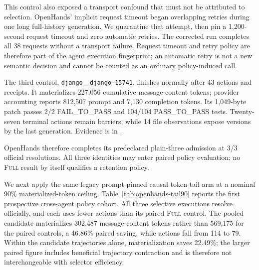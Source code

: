 \documentclass[11pt]{article}
\begin{document}
This control also exposed a transport confound that must not be attributed to
selection.  OpenHands' implicit request timeout began overlapping retries
during one long full-history generation.  We quarantine that attempt, then
pin a 1,200-second request timeout and zero automatic retries.  The corrected
run completes all 38 requests without a transport failure.  Request timeout
and retry policy are therefore part of the agent execution fingerprint; an
automatic retry is not a new semantic decision and cannot be counted as an
ordinary policy-induced call.

The third control, \texttt{django\_\_django-15741}, finishes normally after 43
actions and receipts.  It materializes 227,056 cumulative message-content
tokens; provider accounting reports 812,507 prompt and 7,130 completion
tokens.  Its 1,049-byte patch passes 2/2 FAIL\_TO\_PASS and 104/104
PASS\_TO\_PASS tests.  Twenty-seven terminal actions remain barriers, while
14 file observations expose versions by the last generation.  Evidence is in
.

OpenHands therefore completes its predeclared plain-three admission at 3/3
official resolutions.  All three identities may enter paired policy
evaluation; no \textsc{Full} result by itself qualifies a retention policy.

We next apply the same legacy prompt-pinned causal token-tail arm at a nominal 90\%
materialized-token ceiling.  Table~\ref{tab:openhands-tail90} reports the first
prospective cross-agent policy cohort.  All three selective executions resolve
officially, and each uses fewer actions than its paired \textsc{Full} control.
The pooled candidate materializes 302,487 message-content tokens rather than
569,175 for the paired controls, a 46.86\% paired saving, while actions fall
from 114 to 79.  Within the candidate trajectories alone, materialization
saves 22.49\%; the larger paired figure includes beneficial trajectory
contraction and is therefore not interchangeable with selector efficiency.
\end{document}
